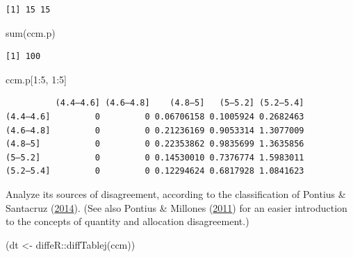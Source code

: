 \documentclass[
  letterpaper,
  DIV=11,
  numbers=noendperiod]{scrartcl}
\newenvironment{Shaded}{\begin{snugshade}}{\end{snugshade}}
\newcommand{\DecValTok}[1]{\textcolor[rgb]{0.68,0.00,0.00}{#1}}
\newcommand{\FunctionTok}[1]{\textcolor[rgb]{0.28,0.35,0.67}{#1}}
\newcommand{\NormalTok}[1]{\textcolor[rgb]{0.00,0.23,0.31}{#1}}
\newcommand{\OtherTok}[1]{\textcolor[rgb]{0.00,0.23,0.31}{#1}}
\newcommand{\SpecialCharTok}[1]{\textcolor[rgb]{0.37,0.37,0.37}{#1}}
\begin{document}
\begin{verbatim}
[1] 15 15
\end{verbatim}

\begin{Shaded}
\begin{Highlighting}[]
\FunctionTok{sum}\NormalTok{(ccm.p)}
\end{Highlighting}
\end{Shaded}

\begin{verbatim}
[1] 100
\end{verbatim}

\begin{Shaded}
\begin{Highlighting}[]
\NormalTok{ccm.p[}\DecValTok{1}\SpecialCharTok{:}\DecValTok{5}\NormalTok{, }\DecValTok{1}\SpecialCharTok{:}\DecValTok{5}\NormalTok{]}
\end{Highlighting}
\end{Shaded}

\begin{verbatim}
          (4.4–4.6] (4.6–4.8]    (4.8–5]   (5–5.2] (5.2–5.4]
(4.4–4.6]         0         0 0.06706158 0.1005924 0.2682463
(4.6–4.8]         0         0 0.21236169 0.9053314 1.3077009
(4.8–5]           0         0 0.22353862 0.9835699 1.3635856
(5–5.2]           0         0 0.14530010 0.7376774 1.5983011
(5.2–5.4]         0         0 0.12294624 0.6817928 1.0841623
\end{verbatim}

Analyze its sources of disagreement, according to the classification of
Pontius \& Santacruz
(\protect\hyperlink{ref-pontiusQuantityExchangeShift2014}{2014}). (See
also Pontius \& Millones
(\protect\hyperlink{ref-PontiusDeathKappabirth2011}{2011}) for an easier
introduction to the concepts of quantity and allocation disagreement.)

\begin{Shaded}
\begin{Highlighting}[]
\NormalTok{(dt }\OtherTok{\textless{}{-}}\NormalTok{ diffeR}\SpecialCharTok{::}\FunctionTok{diffTablej}\NormalTok{(ccm))}
\end{Highlighting}
\end{Shaded}
\end{document}
